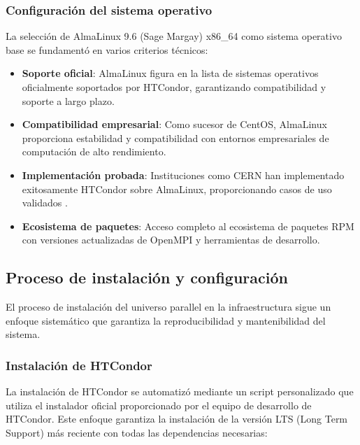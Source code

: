 \subsubsection{Configuración del sistema operativo}
\noindent

La selección de AlmaLinux 9.6 (Sage Margay) x86\_64 como sistema operativo base se fundamentó en varios criterios técnicos:

\begin{itemize}
	\item \textbf{Soporte oficial}: AlmaLinux figura en la lista de sistemas operativos oficialmente soportados por HTCondor, garantizando compatibilidad y soporte a largo plazo.
	
	\item \textbf{Compatibilidad empresarial}: Como sucesor de CentOS, AlmaLinux proporciona estabilidad y compatibilidad con entornos empresariales de computación de alto rendimiento.
	
	\item \textbf{Implementación probada}: Instituciones como CERN han implementado exitosamente HTCondor sobre AlmaLinux, proporcionando casos de uso validados \citep{Bunsic2025}.
	
	\item \textbf{Ecosistema de paquetes}: Acceso completo al ecosistema de paquetes RPM con versiones actualizadas de OpenMPI y herramientas de desarrollo.
\end{itemize}

\subsection{Proceso de instalación y configuración}
\noindent

El proceso de instalación del universo parallel en la infraestructura \GRID sigue un enfoque sistemático que garantiza la reproducibilidad y mantenibilidad del sistema.

\subsubsection{Instalación de HTCondor}
\noindent

La instalación de HTCondor se automatizó mediante un script personalizado que utiliza el instalador oficial proporcionado por el equipo de desarrollo de HTCondor. Este enfoque garantiza la instalación de la versión LTS (Long Term Support) más reciente con todas las dependencias necesarias:

